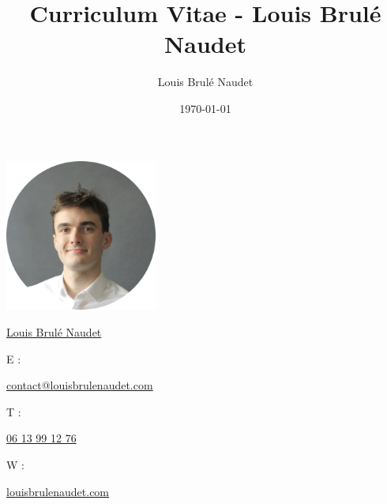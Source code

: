 \documentclass[french, 12pt]{article}
\title{Curriculum Vitae - Louis Brulé Naudet}
\author{Louis Brulé Naudet}
\date{\today}
\begin{document}
{
\begin{center}
\includegraphics[width=5cm]{louis-brule-naudet.jpg}
\end{center}
\vspace*{0.5cm}

\begin{center}
\end{center}
\vspace*{-10cm}
\begin{center}
\datefont
\Large{\href{https://louisbrulenaudet.com}{Louis Brulé Naudet}}
\end{center}

\begin{center}

\fontsize{45pt}{45pt}
\end{center}
\vfill
\vspace*{5cm}
\begin{center}
\begin{ralewaysemibold}{E :}\end{ralewaysemibold} \ralewayLight \href{mailto:contact@louisbrulenaudet.com}{contact@louisbrulenaudet.com}\linebreak
\begin{ralewaysemibold}{T :}\end{ralewaysemibold} \href{tel:0613991276}{06 13 99 12 76}\linebreak
\begin{ralewaysemibold}{W :}\end{ralewaysemibold} \href{https://louisbrulenaudet.com}{louisbrulenaudet.com}\linebreak


\end{center}}
\end{document}
